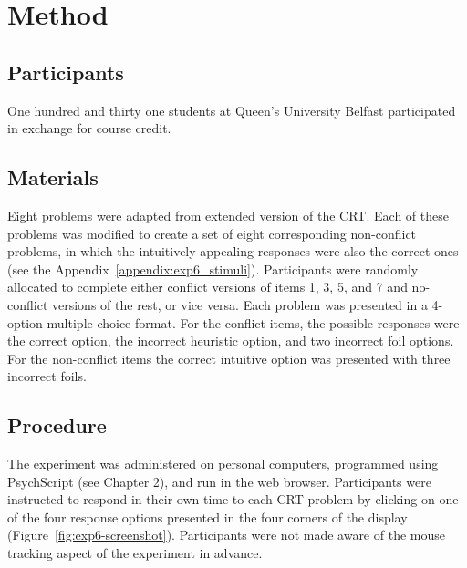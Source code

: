 

\section{Method}

\subsection{Participants}

One hundred and thirty one students at Queen’s University Belfast
participated in exchange for course credit.

\subsection{Materials}

Eight problems were adapted from
 extended version of the CRT.
Each of these problems was modified to create a set of
eight corresponding non-conflict problems,
in which the intuitively appealing responses were also the correct ones
(see the Appendix~\ref{appendix:exp6_stimuli}).
Participants were randomly allocated to complete either
conflict versions of items 1, 3, 5, and 7
and no-conflict versions of the rest, or vice versa.
Each problem was presented in a 4-option multiple choice format.
For the conflict items, the possible responses were the correct option,
the incorrect heuristic option, and two incorrect foil options.
For the non-conflict items the correct intuitive option was presented
with three incorrect foils.

\subsection{Procedure}

The experiment was administered on personal computers,
programmed using PsychScript (see Chapter 2),
and run in the web browser.
Participants were instructed to respond in their own time to each CRT problem
by clicking on one of the four response options
presented in the four corners of the display
(Figure~\ref{fig:exp6-screenshot}).
Participants were not made aware of
the mouse tracking aspect of the experiment in advance. 

